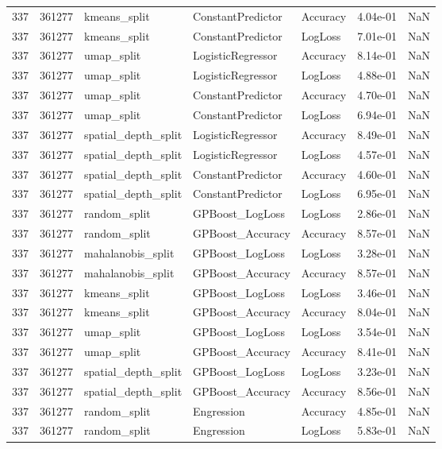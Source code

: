 \begin{tabular}{rrlllrr}
337 & 361277 & kmeans\_split & ConstantPredictor & Accuracy & 4.04e-01 & NaN \\
337 & 361277 & kmeans\_split & ConstantPredictor & LogLoss & 7.01e-01 & NaN \\
337 & 361277 & umap\_split & LogisticRegressor & Accuracy & 8.14e-01 & NaN \\
337 & 361277 & umap\_split & LogisticRegressor & LogLoss & 4.88e-01 & NaN \\
337 & 361277 & umap\_split & ConstantPredictor & Accuracy & 4.70e-01 & NaN \\
337 & 361277 & umap\_split & ConstantPredictor & LogLoss & 6.94e-01 & NaN \\
337 & 361277 & spatial\_depth\_split & LogisticRegressor & Accuracy & 8.49e-01 & NaN \\
337 & 361277 & spatial\_depth\_split & LogisticRegressor & LogLoss & 4.57e-01 & NaN \\
337 & 361277 & spatial\_depth\_split & ConstantPredictor & Accuracy & 4.60e-01 & NaN \\
337 & 361277 & spatial\_depth\_split & ConstantPredictor & LogLoss & 6.95e-01 & NaN \\
337 & 361277 & random\_split & GPBoost\_LogLoss & LogLoss & 2.86e-01 & NaN \\
337 & 361277 & random\_split & GPBoost\_Accuracy & Accuracy & 8.57e-01 & NaN \\
337 & 361277 & mahalanobis\_split & GPBoost\_LogLoss & LogLoss & 3.28e-01 & NaN \\
337 & 361277 & mahalanobis\_split & GPBoost\_Accuracy & Accuracy & 8.57e-01 & NaN \\
337 & 361277 & kmeans\_split & GPBoost\_LogLoss & LogLoss & 3.46e-01 & NaN \\
337 & 361277 & kmeans\_split & GPBoost\_Accuracy & Accuracy & 8.04e-01 & NaN \\
337 & 361277 & umap\_split & GPBoost\_LogLoss & LogLoss & 3.54e-01 & NaN \\
337 & 361277 & umap\_split & GPBoost\_Accuracy & Accuracy & 8.41e-01 & NaN \\
337 & 361277 & spatial\_depth\_split & GPBoost\_LogLoss & LogLoss & 3.23e-01 & NaN \\
337 & 361277 & spatial\_depth\_split & GPBoost\_Accuracy & Accuracy & 8.56e-01 & NaN \\
337 & 361277 & random\_split & Engression & Accuracy & 4.85e-01 & NaN \\
337 & 361277 & random\_split & Engression & LogLoss & 5.83e-01 & NaN \\

\end{tabular}
